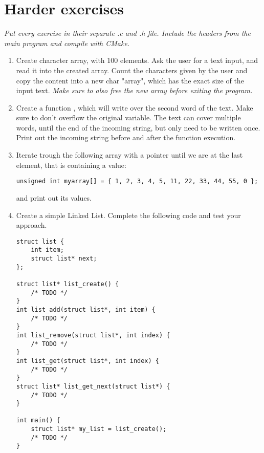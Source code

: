 \documentclass[12pt,a4paper]{article}
\begin{document}
    \section{Harder exercises}
    \textit{Put every exercise in their separate .c and .h file. Include the headers from the main program and compile with CMake.}
    \begin{enumerate}
        \item Create character array, with 100 elements. Ask the user for a text input, and read it into the created array.
              Count the characters given by the user and copy the content into a new char "array", which has the exact
              size of the input text. \textit{Make sure to also free the new array before exiting the program.}
        \item Create a function , which will write  over the second
              word of the text. Make sure to don't overflow the original variable. The text can cover multiple words,
              until the end of the incoming string, but only need to be written once. Print out the incoming string
              before and after the function execution.
        \item Iterate trough the following array with a pointer until we are at the last element, that is containing a  value:
              \begin{lstlisting}[style=CStyle]
unsigned int myarray[] = { 1, 2, 3, 4, 5, 11, 22, 33, 44, 55, 0 };
\end{lstlisting}
              and print out its values.
        \item Create a simple Linked List. Complete the following code and test your approach.
              \begin{lstlisting}[style=CStyle]
struct list {
    int item;
    struct list* next;
};

struct list* list_create() {
    /* TODO */
}
int list_add(struct list*, int item) {
    /* TODO */
}
int list_remove(struct list*, int index) {
    /* TODO */
}
int list_get(struct list*, int index) {
    /* TODO */
}
struct list* list_get_next(struct list*) {
    /* TODO */
}

int main() {
    struct list* my_list = list_create();
    /* TODO */
}
\end{lstlisting}
    \end{enumerate}

\end{document}
